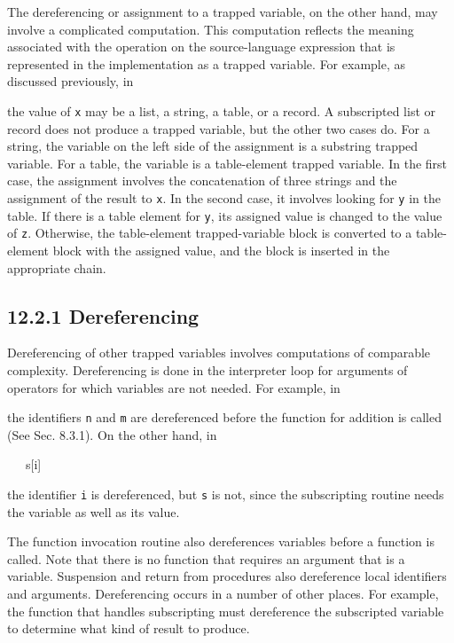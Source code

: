 
The dereferencing or assignment to a trapped variable, on the other
hand, may involve a complicated computation. This computation reflects
the meaning associated with the operation on the source-language
expression that is represented in the implementation as a trapped
variable. For example, as discussed previously, in


\noindent the value of \texttt{x} may be a list, a string, a table, or a
record. A subscripted list or record does not produce a trapped
variable, but the other two cases do. For a string, the variable on
the left side of the assignment is a substring trapped variable. For a
table, the variable is a table-element trapped variable. In the first
case, the assignment involves the concatenation of three strings and
the assignment of the result to \texttt{x}. In the second case, it involves
looking for \texttt{y} in the table. If there is a table element for \texttt{y}, its
assigned value is changed to the value of \texttt{z}.  Otherwise, the
table-element trapped-variable block is converted to a table-element
block with the assigned value, and the block is inserted in the
appropriate chain.

\subsection[12.2.1 Dereferencing]{12.2.1 Dereferencing}

Dereferencing of other trapped variables involves computations of
comparable complexity. Dereferencing is done in the interpreter loop
for arguments of operators for which variables are not needed. For
example, in


\noindent the identifiers \texttt{n} and \texttt{m} are dereferenced before the function
for addition is called (See Sec. 8.3.1). On the other hand, in

{\ttfamily\mdseries
\ \ \ s[i]}

\noindent the identifier \texttt{i} is dereferenced, but \texttt{s} is not, since the
subscripting routine needs the variable as well as its value.

The function invocation routine also dereferences variables before a
function is called. Note that there is no function that requires an
argument that is a variable. Suspension and return from procedures
also dereference local identifiers and arguments. Dereferencing occurs
in a number of other places. For example, the function that handles
subscripting must dereference the subscripted variable to determine
what kind of result to produce.

